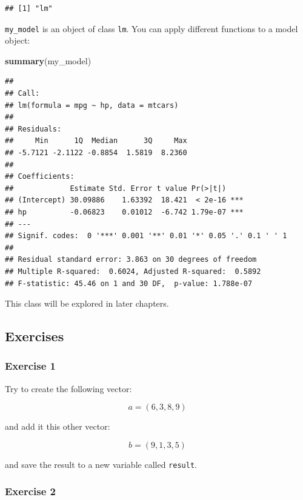 \documentclass[]{gitbook}
\newenvironment{Shaded}{\begin{snugshade}}{\end{snugshade}}
\newcommand{\KeywordTok}[1]{\textcolor[rgb]{0.13,0.29,0.53}{\textbf{#1}}}
\newcommand{\NormalTok}[1]{#1}
\theoremstyle{definition}
\theoremstyle{definition}
\theoremstyle{definition}
\theoremstyle{remark}
\begin{document}
\begin{verbatim}
## [1] "lm"
\end{verbatim}

\texttt{my\_model} is an object of class \texttt{lm}. You can apply
different functions to a model object:

\begin{Shaded}
\begin{Highlighting}[]
\KeywordTok{summary}\NormalTok{(my_model)}
\end{Highlighting}
\end{Shaded}

\begin{verbatim}
## 
## Call:
## lm(formula = mpg ~ hp, data = mtcars)
## 
## Residuals:
##     Min      1Q  Median      3Q     Max 
## -5.7121 -2.1122 -0.8854  1.5819  8.2360 
## 
## Coefficients:
##             Estimate Std. Error t value Pr(>|t|)    
## (Intercept) 30.09886    1.63392  18.421  < 2e-16 ***
## hp          -0.06823    0.01012  -6.742 1.79e-07 ***
## ---
## Signif. codes:  0 '***' 0.001 '**' 0.01 '*' 0.05 '.' 0.1 ' ' 1
## 
## Residual standard error: 3.863 on 30 degrees of freedom
## Multiple R-squared:  0.6024, Adjusted R-squared:  0.5892 
## F-statistic: 45.46 on 1 and 30 DF,  p-value: 1.788e-07
\end{verbatim}

This class will be explored in later chapters.

\hypertarget{exercises-1}{%
\subsection{Exercises}\label{exercises-1}}

\hypertarget{exercise-1-1}{%
\subsubsection*{Exercise 1}\label{exercise-1-1}}

Try to create the following vector:

\[a = (6,3,8,9)\]

and add it this other vector:

\[b = (9,1,3,5)\]

and save the result to a new variable called \texttt{result}.

\hypertarget{exercise-2}{%
\subsubsection*{Exercise 2}\label{exercise-2}}
\end{document}

